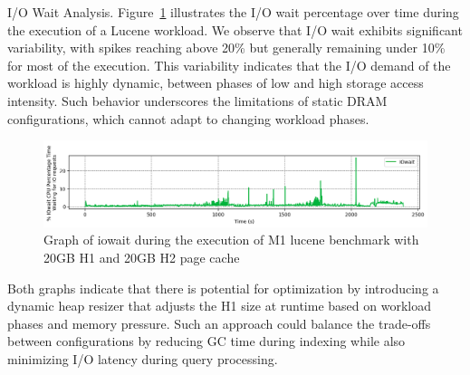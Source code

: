 I/O Wait Analysis. Figure~\ref{fig:iowait} illustrates the I/O wait percentage over time during the execution of a Lucene workload. We observe that 
I/O wait exhibits significant variability, with spikes reaching above 20\% but generally remaining under 10\% for most of the 
execution. This variability indicates that the I/O demand of the workload is highly dynamic, between phases of low and high storage access 
intensity. Such behavior underscores the limitations of static DRAM configurations,
which cannot adapt to changing workload phases. 


\begin{figure}[htbp]
  \centering
  \includegraphics[width=1\columnwidth]{fig/iow_cpu.png}
  \caption{Graph of iowait during the execution of M1 lucene benchmark with 20GB H1 and 20GB H2 page cache}
  \label{fig:iowait}
\end{figure}

Both graphs indicate that there is potential for optimization by introducing a dynamic heap resizer that adjusts the H1 size at runtime based on workload phases and memory pressure. Such an approach could balance the trade-offs between configurations by reducing GC time during indexing while also minimizing I/O latency during query processing. 
